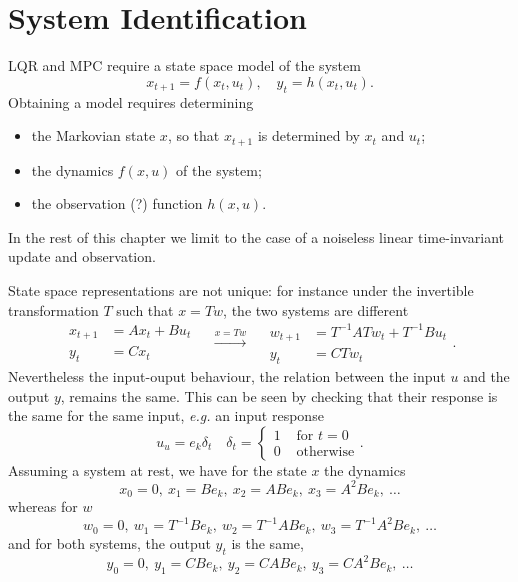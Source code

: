 \chapter{System Identification}
\label{sec:system-identification}

LQR and MPC require a state space model of the system
\begin{equation*}
  x_{t+1} = f(x_t,u_t),\quad y_t = h(x_t,u_t).
\end{equation*}
Obtaining a model requires determining
\begin{itemize}
\item the Markovian state $x$, so that $x_{t+1}$ is determined by $x_t$ and $u_t$;
\item the dynamics $f(x,u)$ of the system;
\item the observation (?) function $h(x,u)$.
\end{itemize}
In the rest of this chapter we limit to the case of a noiseless linear time-invariant update and observation.

State space representations are not unique: for instance under the invertible transformation $T$ such that $x=Tw$, the two systems are different
\begin{equation*}
  \begin{aligned}
    x_{t+1} &= Ax_t + Bu_t \\
    y_t &= Cx_t
  \end{aligned}\quad \stackrel{x=Tw}{\longrightarrow}\quad
  \begin{aligned}
    w_{t+1} &= T^{-1}ATw_t + T^{-1}Bu_t \\
    y_t &= CTw_t
  \end{aligned}.
\end{equation*}
Nevertheless the input-ouput behaviour, the relation between the input $u$ and the output $y$, remains the same. This can be seen by checking that their response is the same for the same input, \textit{e.g.} an input response
\begin{equation*}
  u_u=e_k\delta_t\quad \delta_t =
  \begin{cases}
    1 & \text{ for } t=0 \\
    0 & \text{ otherwise}
  \end{cases}.
\end{equation*}
Assuming a system at rest, we have for the state $x$ the dynamics
\begin{equation*}
  x_0=0,\ x_1=Be_k,\ x_2=ABe_k,\ x_3=A^2Be_k,\ \ldots
\end{equation*}
whereas for $w$
\begin{equation*}
  w_0=0,\ w_1=T^{-1}Be_k,\ w_2=T^{-1}ABe_k,\ w_3=T^{-1}A^2Be_k,\ \ldots
\end{equation*}
and for both systems, the output $y_t$ is the same,
\begin{equation*}
  y_0=0,\ y_1=CBe_k,\ y_2=CABe_k,\ y_3=CA^2Be_k,\ \ldots
\end{equation*}

